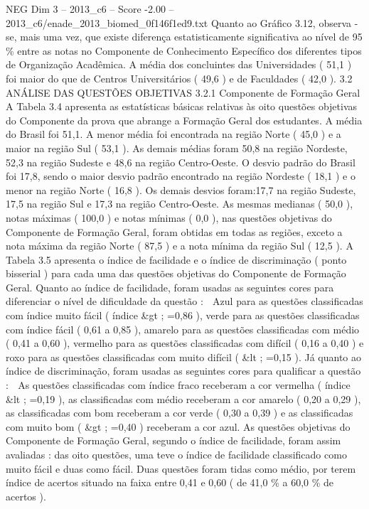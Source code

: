 \begin{textsample}{NEG Dim 3 – 2013\_c6 – Score -2.00 – 2013\_c6/enade\_2013\_biomed\_0f146f1ed9.txt}
Quanto ao Gráfico 3.12, observa -se, mais uma vez, que existe diferença estatisticamente significativa ao nível de 95 \% entre as notas no Componente de Conhecimento Específico dos diferentes tipos de Organização Acadêmica.
A média dos concluintes das Universidades ( 51,1 ) foi maior do que de Centros Universitários ( 49,6 ) e de Faculdades ( 42,0 ). 3.2 ANÁLISE DAS QUESTÕES OBJETIVAS 3.2.1 Componente de Formação Geral A Tabela 3.4 apresenta as estatísticas básicas relativas às oito questões objetivas do Componente da prova que abrange a Formação Geral dos estudantes.
A média do Brasil foi 51,1.
A menor média foi encontrada na região Norte ( 45,0 ) e a maior na região Sul ( 53,1 ).
As demais médias foram 50,8 na região Nordeste, 52,3 na região Sudeste e 48,6 na região Centro-Oeste.
O desvio padrão do Brasil foi 17,8, sendo o maior desvio padrão encontrado na região Nordeste ( 18,1 ) e o menor na região Norte ( 16,8 ).
Os demais desvios foram:17,7 na região Sudeste, 17,5 na região Sul e 17,3 na região Centro-Oeste.
As mesmas medianas ( 50,0 ), notas máximas ( 100,0 ) e notas mínimas ( 0,0 ), nas questões objetivas do Componente de Formação Geral, foram obtidas em todas as regiões, exceto a nota máxima da região Norte ( 87,5 ) e a nota mínima da região Sul ( 12,5 ).
A Tabela 3.5 apresenta o índice de facilidade e o índice de discriminação ( ponto bisserial ) para cada uma das questões objetivas do Componente de Formação Geral.
Quanto ao índice de facilidade, foram usadas as seguintes cores para diferenciar o nível de dificuldade da questão :  Azul para as questões classificadas com índice muito fácil ( índice \&gt ; =0,86 ), verde para as questões classificadas com índice fácil ( 0,61 a 0,85 ), amarelo para as questões classificadas com médio ( 0,41 a 0,60 ), vermelho para as questões classificadas com difícil ( 0,16 a 0,40 ) e roxo para as questões classificadas com muito difícil ( \&lt ; =0,15 ).
Já quanto ao índice de discriminação, foram usadas as seguintes cores para qualificar a questão :  As questões classificadas com índice fraco receberam a cor vermelha ( índice \&lt ; =0,19 ), as classificadas com médio receberam a cor amarelo ( 0,20 a 0,29 ), as classificadas com bom receberam a cor verde ( 0,30 a 0,39 ) e as classificadas com muito bom ( \&gt ; =0,40 ) receberam a cor azul.
As questões objetivas do Componente de Formação Geral, segundo o índice de facilidade, foram assim avaliadas : das oito questões, uma teve o índice de facilidade classificado como muito fácil e duas como fácil.
Duas questões foram tidas como médio, por terem índice de acertos situado na faixa entre 0,41 e 0,60 ( de 41,0 \% a 60,0 \% de acertos ).

\end{textsample}
